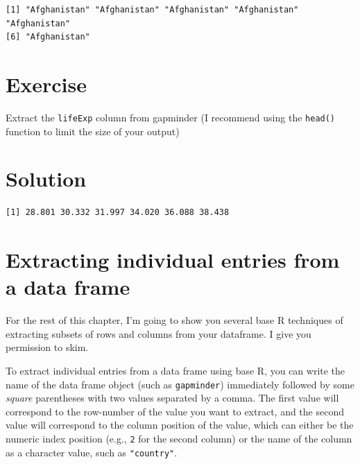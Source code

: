 \documentclass[
  letterpaper,
  DIV=11,
  numbers=noendperiod]{scrreprt}
\newenvironment{Shaded}{\begin{snugshade}}{\end{snugshade}}
\newcommand{\FunctionTok}[1]{\textcolor[rgb]{0.28,0.35,0.67}{#1}}
\newcommand{\NormalTok}[1]{\textcolor[rgb]{0.00,0.23,0.31}{#1}}
\newcommand{\SpecialCharTok}[1]{\textcolor[rgb]{0.37,0.37,0.37}{#1}}
\begin{document}
\begin{Shaded}
\end{Shaded}

\begin{verbatim}
[1] "Afghanistan" "Afghanistan" "Afghanistan" "Afghanistan" "Afghanistan"
[6] "Afghanistan"
\end{verbatim}

\section{Exercise}

Extract the \texttt{lifeExp} column from gapminder (I recommend using
the \texttt{head()} function to limit the size of your output)

\section{Solution}

\begin{Shaded}
\end{Shaded}

\begin{verbatim}
[1] 28.801 30.332 31.997 34.020 36.088 38.438
\end{verbatim}

\section{Extracting individual entries from a data
frame}\label{extracting-individual-entries-from-a-data-frame}

For the rest of this chapter, I'm going to show you several base R
techniques of extracting subsets of rows and columns from your
dataframe. I give you permission to skim.

To extract individual entries from a data frame using base R, you can
write the name of the data frame object (such as \texttt{gapminder})
immediately followed by some \emph{square} parentheses with two values
separated by a comma. The first value will correspond to the row-number
of the value you want to extract, and the second value will correspond
to the column position of the value, which can either be the numeric
index position (e.g., \texttt{2} for the second column) or the name of
the column as a character value, such as \texttt{"country"}.
\end{document}
